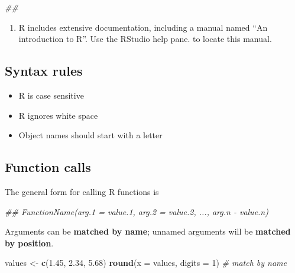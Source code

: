 \documentclass[]{book}
\newenvironment{Shaded}{\begin{snugshade}}{\end{snugshade}}
\newcommand{\CommentTok}[1]{\textcolor[rgb]{0.56,0.35,0.01}{\textit{#1}}}
\newcommand{\DataTypeTok}[1]{\textcolor[rgb]{0.13,0.29,0.53}{#1}}
\newcommand{\DecValTok}[1]{\textcolor[rgb]{0.00,0.00,0.81}{#1}}
\newcommand{\FloatTok}[1]{\textcolor[rgb]{0.00,0.00,0.81}{#1}}
\newcommand{\KeywordTok}[1]{\textcolor[rgb]{0.13,0.29,0.53}{\textbf{#1}}}
\newcommand{\NormalTok}[1]{#1}
\newcommand{\StringTok}[1]{\textcolor[rgb]{0.31,0.60,0.02}{#1}}
\providecommand{\tightlist}{%
  \setlength{\itemsep}{0pt}\setlength{\parskip}{0pt}}
\begin{document}
\begin{Shaded}
\begin{Highlighting}[]
\CommentTok{##}
\end{Highlighting}
\end{Shaded}

\begin{enumerate}
\def\labelenumi{\arabic{enumi}.}
\setcounter{enumi}{2}
\tightlist
\item
  R includes extensive documentation, including a manual named ``An
  introduction to R''. Use the RStudio help pane. to locate this manual.
\end{enumerate}

\hypertarget{syntax-rules}{%
\subsection{Syntax rules}\label{syntax-rules}}

\begin{itemize}
\tightlist
\item
  R is case sensitive
\item
  R ignores white space
\item
  Object names should start with a letter
\end{itemize}

\hypertarget{function-calls}{%
\subsection{Function calls}\label{function-calls}}

The general form for calling R functions is

\begin{Shaded}
\begin{Highlighting}[]
\CommentTok{## FunctionName(arg.1 = value.1, arg.2 = value.2, ..., arg.n - value.n)}
\end{Highlighting}
\end{Shaded}

Arguments can be \textbf{matched by name}; unnamed arguments will be \textbf{matched by position}.

\begin{Shaded}
\begin{Highlighting}[]
\NormalTok{values <-}\StringTok{ }\KeywordTok{c}\NormalTok{(}\FloatTok{1.45}\NormalTok{, }\FloatTok{2.34}\NormalTok{, }\FloatTok{5.68}\NormalTok{)}
\KeywordTok{round}\NormalTok{(}\DataTypeTok{x =}\NormalTok{ values, }\DataTypeTok{digits =} \DecValTok{1}\NormalTok{) }\CommentTok{# match by name}
\end{Highlighting}
\end{Shaded}
\end{document}
